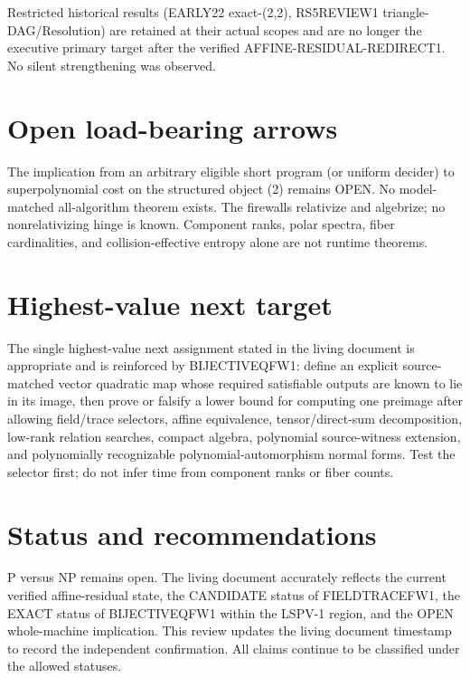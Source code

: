 \documentclass[11pt]{article}
\begin{document}
Restricted historical results (EARLY22 exact-(2,2), RS5REVIEW1 triangle-DAG/Resolution) are retained at their actual scopes and are no longer the executive primary target after the verified AFFINE-RESIDUAL-REDIRECT1. No silent strengthening was observed.

\section{Open load-bearing arrows}
The implication from an arbitrary eligible short program (or uniform decider) to superpolynomial cost on the structured object (2) remains OPEN. No model-matched all-algorithm theorem exists. The firewalls relativize and algebrize; no nonrelativizing hinge is known. Component ranks, polar spectra, fiber cardinalities, and collision-effective entropy alone are not runtime theorems.

\section{Highest-value next target}
The single highest-value next assignment stated in the living document is appropriate and is reinforced by BIJECTIVEQFW1: define an explicit source-matched vector quadratic map whose required satisfiable outputs are known to lie in its image, then prove or falsify a lower bound for computing one preimage after allowing field/trace selectors, affine equivalence, tensor/direct-sum decomposition, low-rank relation searches, compact algebra, polynomial source-witness extension, and polynomially recognizable polynomial-automorphism normal forms. Test the selector first; do not infer time from component ranks or fiber counts.

\section{Status and recommendations}
P versus NP remains open. The living document accurately reflects the current verified affine-residual state, the CANDIDATE status of FIELDTRACEFW1, the EXACT status of BIJECTIVEQFW1 within the LSPV-1 region, and the OPEN whole-machine implication. This review updates the living document timestamp to record the independent confirmation. All claims continue to be classified under the allowed statuses.

\end{document}
